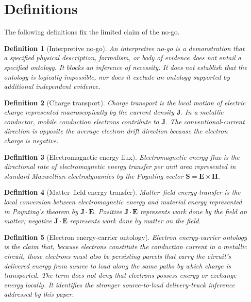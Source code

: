 \documentclass[12pt,onecolumn]{article}
\newcounter{nogo}[section]
\newtheorem{definition}{Definition}
\begin{document}
\section{Definitions}

The following definitions fix the limited claim of the no-go.

\begin{definition}[Interpretive no-go]
\label{def:interpretivenogo}
An interpretive no-go is a demonstration that a specified physical description, formalism, or body of evidence does not entail a specified ontology. It blocks an inference of necessity. It does not establish that the ontology is logically impossible, nor does it exclude an ontology supported by additional independent evidence.
\end{definition}

\begin{definition}[Charge transport]
\label{def:chargetransport}
Charge transport is the local motion of electric charge represented macroscopically by the current density $\mathbf J$. In a metallic conductor, mobile conduction electrons contribute to $\mathbf J$. The conventional-current direction is opposite the average electron drift direction because the electron charge is negative.
\end{definition}

\begin{definition}[Electromagnetic energy flux]
\label{def:energyflux}
Electromagnetic energy flux is the directional rate of electromagnetic energy transfer per unit area represented in standard Maxwellian electrodynamics by the Poynting vector $\mathbf S=\mathbf E\times\mathbf H$.
\end{definition}

\begin{definition}[Matter--field energy transfer]
\label{def:coupling}
Matter--field energy transfer is the local conversion between electromagnetic energy and material energy represented in Poynting's theorem by $\mathbf J\cdot\mathbf E$. Positive $\mathbf J\cdot\mathbf E$ represents work done by the field on matter; negative $\mathbf J\cdot\mathbf E$ represents work done by matter on the field.
\end{definition}

\begin{definition}[Electron energy-carrier ontology]
\label{def:carrierontology}
Electron energy-carrier ontology is the claim that, because electrons constitute the conduction current in a metallic circuit, those electrons must also be persisting parcels that carry the circuit's delivered energy from source to load along the same paths by which charge is transported. The term does not deny that electrons possess energy or exchange energy locally. It identifies the stronger source-to-load delivery-truck inference addressed by this paper.
\end{definition}
\end{document}
